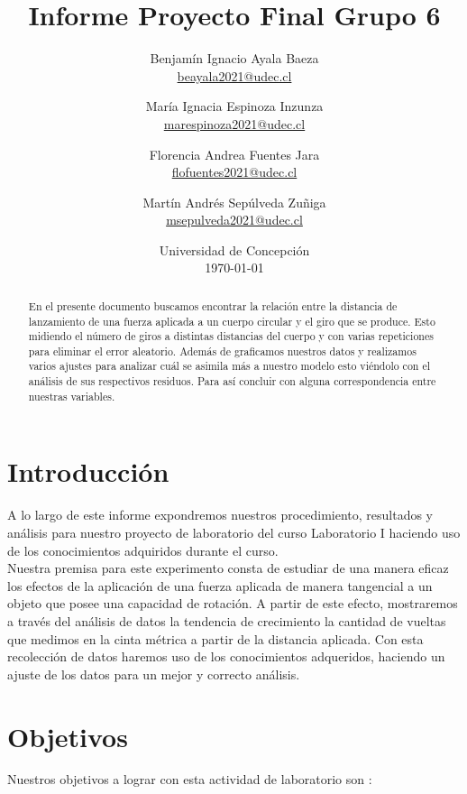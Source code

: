 \documentclass{article}
\title{Informe Proyecto Final Grupo 6}
\author{Benjam\'in Ignacio Ayala Baeza  \\ \href{mailto:beayala2021@udec.cl}{beayala2021@udec.cl} 
        \and Mar\'ia Ignacia Espinoza Inzunza \\ \href{mailto:marespinoza2021@udec.cl}{marespinoza2021@udec.cl} \\
        \and Florencia Andrea Fuentes Jara \\ \href{mailto:flofuentes2021@udec.cl}{flofuentes2021@udec.cl} \\
        \and Mart\'in Andrés Sepúlveda Zu\~niga \\ \href{mailto:msepulveda2021@udec.cl}{msepulveda2021@udec.cl} \\
\date{Universidad de Concepci\'on \\ \today}
}
\begin{document}
\maketitle

\begin{abstract}

En el presente documento buscamos encontrar la relación entre la distancia de lanzamiento de una fuerza aplicada a un cuerpo circular y el giro que se produce. Esto midiendo el número de giros a distintas distancias del cuerpo y con varias repeticiones para eliminar el error aleatorio. Además de graficamos nuestros datos y realizamos varios ajustes para analizar cuál se asimila más a nuestro modelo esto viéndolo con el análisis de sus respectivos residuos. Para así concluir con alguna correspondencia entre nuestras variables.

\end{abstract}

\section{Introducción} \label{intro}
 A lo largo de este informe expondremos nuestros procedimiento, resultados y análisis para nuestro proyecto de laboratorio del curso Laboratorio I haciendo uso de los conocimientos adquiridos durante el curso.\\
 Nuestra premisa para este experimento consta de estudiar de una manera eficaz los efectos de la aplicación de una fuerza aplicada de manera tangencial a un objeto que posee una capacidad de rotación. 
A partir de este efecto, mostraremos a través del análisis de datos la tendencia de crecimiento la cantidad de vueltas que medimos en la cinta métrica a partir de la distancia aplicada. Con esta recolección de datos haremos uso de los conocimientos adqueridos, haciendo un ajuste de los datos para un mejor y correcto análisis. 




\section{Objetivos}
Nuestros objetivos a lograr con esta actividad de laboratorio son :
\end{document}
